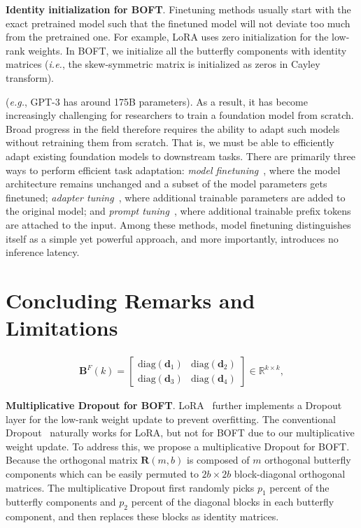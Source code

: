 \textbf{Identity initialization for BOFT}. Finetuning methods usually start with the exact pretrained model such that the finetuned model will not deviate too much from the pretrained one. For example, LoRA uses zero initialization for the low-rank weights. In BOFT, we initialize all the butterfly components with identity matrices (\emph{i.e.}, the skew-symmetric matrix is initialized as zeros in Cayley transform).

(\emph{e.g.}, GPT-3 has around 175B parameters). As a result, it has become increasingly challenging for researchers to train a foundation model from scratch. Broad progress in the field therefore requires the ability to adapt such models without retraining them from scratch. That is, we must be able to efficiently adapt existing foundation models to downstream tasks. There are primarily three ways to perform efficient task adaptation: \emph{model finetuning}~\cite{hulora2022,zaken2022bitfit,guo2020parameter,raffel2020exploring,qiu2023controlling,zhang2022adaptive,chavan2023one}, where the model architecture remains unchanged and a subset of the model parameters gets finetuned; \emph{adapter tuning}~\cite{rebuffi2017learning,houlsby2019parameter,pfeiffer2020adapterfusion,lin2020exploring,he2021towards}, where additional trainable parameters are added to the original model; and \emph{prompt tuning}~\cite{li2021prefix,lester2021power}, where additional trainable prefix tokens are attached to the input. Among these methods, model finetuning distinguishes itself as a simple yet powerful approach, and more importantly, introduces no inference latency.

\section{Concluding Remarks and Limitations}

\begin{equation}\label{eq:but_factor}
\begin{aligned}
    \bm{B}^F(k)=\begin{bmatrix}
    \text{diag}(\bm{d}_1) & \text{diag}(\bm{d}_2) \\
    \text{diag}(\bm{d}_3) & \text{diag}(\bm{d}_4)
    \end{bmatrix}\in\mathbb{R}^{k\times k},
\end{aligned}
\end{equation}

\textbf{Multiplicative Dropout for BOFT}. LoRA~\cite{hulora2022} further implements a Dropout layer for the low-rank weight update to prevent overfitting. The conventional Dropout~\cite{srivastava2014dropout} naturally works for LoRA, but not for BOFT due to our multiplicative weight update. To address this, we propose a multiplicative Dropout for BOFT. Because the orthogonal matrix $\bm{R}(m,b)$ is composed of $m$ orthogonal butterfly components which can be easily permuted to $2b\times 2b$ block-diagonal orthogonal matrices. The multiplicative Dropout first randomly picks $p_1$ percent of the butterfly components and $p_2$ percent of the diagonal blocks in each butterfly component, and then replaces these blocks as identity matrices.

